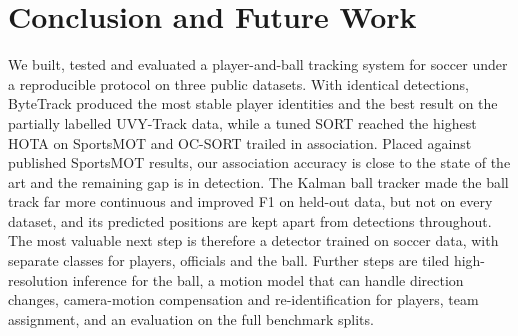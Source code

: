 \section{Conclusion and Future Work}
We built, tested and evaluated a player-and-ball tracking system for soccer
under a reproducible protocol on three public datasets. With identical
detections, ByteTrack produced the most stable player identities and the best
result on the partially labelled UVY-Track data, while a tuned SORT reached the
highest HOTA on SportsMOT and OC-SORT trailed in association. Placed against
published SportsMOT results, our association accuracy is close to the state of
the art and the remaining gap is in detection. The Kalman ball tracker made the
ball track far more continuous and improved F1 on held-out data, but not on
every dataset, and its predicted positions are kept apart from detections
throughout. The most valuable next step is therefore a detector trained on
soccer data, with separate classes for players, officials and the ball.
Further steps are tiled high-resolution inference for the ball, a motion model
that can handle direction changes, camera-motion compensation and
re-identification for players, team assignment, and an evaluation on the full
benchmark splits.

